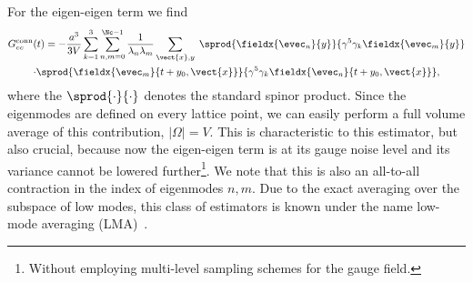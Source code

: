 For the eigen-eigen term we find
\begin{multline} \label{eq:Gconn:eigen-eigen}
G_{ee}^{\text{conn}}(t)
= - \frac{a^{3}}{3 V}
\sum_{k=1}^{3}
\sum_{n,m=0}^{\Nc-1} \frac{1}{\lambda_{n} \lambda_{m}}
\sum_{\vect{x},y} \;
\sprod{
  \fieldx{\evec_{n}}{y}
}{
  \gamma^{5}
  \gamma_k
  \fieldx{\evec_{m}}{y}
} \\
\cdot
\sprod{
  \fieldx{\evec_{m}}{t+y_0, \vect{x}}
}{
  \gamma^{5}
  \gamma_k
  \fieldx{\evec_{n}}{t+y_0, \vect{x}}
},
\end{multline}
where the $\sprod{\cdot}{\cdot}$ denotes the standard spinor product.
Since the eigenmodes are defined on every lattice point, we can easily perform a full volume average of this contribution, $\lvert \Omega \rvert = V$.
This is characteristic to this estimator, but also crucial, because now the eigen-eigen term is at its gauge noise level and its variance cannot be lowered further\footnote{Without employing multi-level sampling schemes for the gauge field.}.
We note that this is also an all-to-all contraction in the index of eigenmodes $n,m$.
Due to the exact averaging over the subspace of low modes, this class of estimators is known under the name low-mode averaging (LMA)~\cite{Neff_2001,Giusti_2004,DeGrand_2004}.

